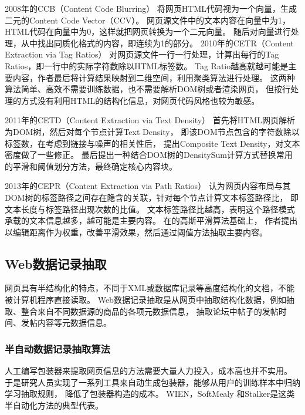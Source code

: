 2008年的CCB（Content Code Blurring）
将网页HTML代码视为一个向量，生成二元的Content Code Vector（CCV）。
网页源文件中的文本内容在向量中为1，HTML代码在向量中为0，这样就把网页转换为一个二元向量。
随后对向量进行处理，从中找出同质化格式的内容，即连续为1的部分。
2010年的CETR（Content Extraction via Tag Ratios）
对网页源文件一行一行处理，计算出每行的Tag Ratios，即一行中的实际字符数除以HTML标签数。
Tag Ratio越高就越可能是主要内容，作者最后将计算结果映射到二维空间，利用聚类算法进行处理。
这两种算法简单、高效不需要训练数据，也不需要解析DOM树或者渲染网页，
但按行处理的方式没有利用HTML的结构化信息，对网页代码风格也较为敏感。

2011年的CETD（Content Extraction via Text Density）
首先将HTML网页解析为DOM树，然后对每个节点计算Text Density，
即该DOM节点包含的字符数除以标签数，在考虑到链接与噪声的相关性后，
提出Composite Text Density，对文本密度做了一些修正。
最后提出一种结合DOM树的DensitySum计算方式替换常用的平滑和阈值划分方法，最终确定核心内容块。

2013年的CEPR（Content Extraction via Path Ratios）
认为网页内容布局与其DOM树的标签路径之间存在隐含的关联，针对每个节点计算文本标签路径比，
即文本长度与标签路径出现次数的比值。
文本标签路径比越高，表明这个路径模式承载的文本信息越多，越可能是主要内容。
在\cite{weninger2010cetr}的高斯平滑算法基础上，
作者提出以编辑距离作为权重，改善平滑效果，然后通过阈值方法抽取主要内容。

\subsection{Web数据记录抽取}
网页具有半结构化的特点，不同于XML或数据库记录等高度结构化的文档，不能被计算机程序直接读取。
Web数据记录抽取是从网页中抽取结构化数据，例如抽取、整合来自不同数据源的商品的各项元数据信息，
抽取论坛中帖子的发帖时间、发帖内容等元数据信息。

\subsubsection{半自动数据记录抽取算法}

人工编写包装器来提取网页信息的方法需要大量人力投入，成本高也并不实用。
于是研究人员实现了一系列工具来自动生成包装器，能够从用户的训练样本中归纳学习抽取规则，
降低了包装器构造的成本。
WIEN，SoftMealy
和Stalker是这类半自动化方法的典型代表。

